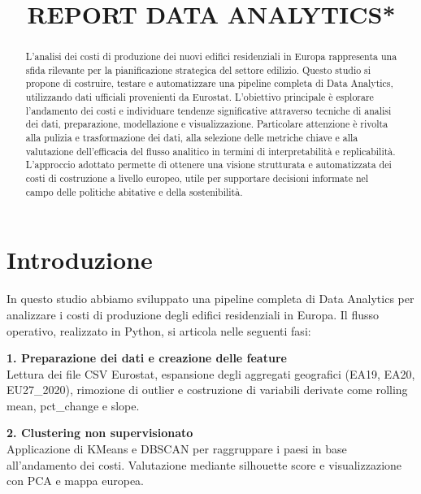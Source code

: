 \documentclass[conference]{IEEEtran}
\begin{document}
\title{REPORT DATA ANALYTICS*\\}

\author{}

\maketitle
\begin{abstract}
    L’analisi dei costi di produzione dei nuovi edifici residenziali in Europa rappresenta una sfida rilevante per la pianificazione strategica del settore edilizio. Questo studio si propone di costruire, testare e automatizzare una pipeline completa di Data Analytics, utilizzando dati ufficiali provenienti da Eurostat. L’obiettivo principale è esplorare l’andamento dei costi e individuare tendenze significative attraverso tecniche di analisi dei dati, preparazione, modellazione e visualizzazione. Particolare attenzione è rivolta alla pulizia e trasformazione dei dati, alla selezione delle metriche chiave e alla valutazione dell’efficacia del flusso analitico in termini di interpretabilità e replicabilità. L’approccio adottato permette di ottenere una visione strutturata e automatizzata dei costi di costruzione a livello europeo, utile per supportare decisioni informate nel campo delle politiche abitative e della sostenibilità.
\end{abstract}

\section*{\LARGE\textbf{Introduzione}}

In questo studio abbiamo sviluppato una pipeline completa di Data Analytics per analizzare i costi di produzione degli edifici residenziali in Europa. Il flusso operativo, realizzato in Python, si articola nelle seguenti fasi:

\vspace{1em}

{\large \textbf{1. Preparazione dei dati e creazione delle feature}}\\
{\small Lettura dei file CSV Eurostat, espansione degli aggregati geografici (EA19, EA20, EU27\_2020), rimozione di outlier e costruzione di variabili derivate come rolling mean, pct\_change e slope.}

\vspace{1em}

{\large \textbf{2. Clustering non supervisionato}}\\
{\small Applicazione di KMeans e DBSCAN per raggruppare i paesi in base all’andamento dei costi. Valutazione mediante silhouette score e visualizzazione con PCA e mappa europea.}
\end{document}
